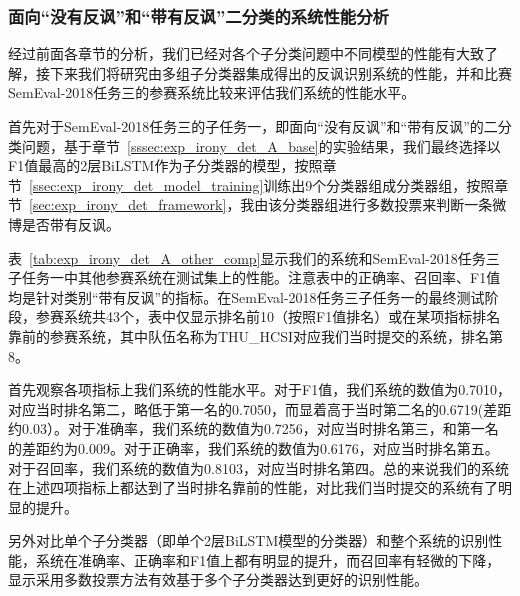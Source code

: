 \subsubsection{面向“没有反讽”和“带有反讽”二分类的系统性能分析}

经过前面各章节的分析，我们已经对各个子分类问题中不同模型的性能有大致了解，接下来我们将研究由多组子分类器集成得出的反讽识别系统的性能，并和比赛SemEval-2018任务三的参赛系统比较来评估我们系统的性能水平。

首先对于SemEval-2018任务三的子任务一，即面向“没有反讽”和“带有反讽”的二分类问题，基于章节~\ref{sssec:exp_irony_det_A_base}的实验结果，我们最终选择以F1值最高的2层BiLSTM作为子分类器的模型，按照章节~\ref{ssec:exp_irony_det_model_training}训练出9个分类器组成分类器组，按照章节~\ref{sec:exp_irony_det_framework}，我由该分类器组进行多数投票来判断一条微博是否带有反讽。

表~\ref{tab:exp_irony_det_A_other_comp}显示我们的系统和SemEval-2018任务三子任务一中其他参赛系统在测试集上的性能。注意表中的正确率、召回率、F1值均是针对类别“带有反讽”的指标。在SemEval-2018任务三子任务一的最终测试阶段，参赛系统共43个，表中仅显示排名前10（按照F1值排名）或在某项指标排名靠前的参赛系统，其中队伍名称为THU\_HCSI对应我们当时提交的系统，排名第8。

首先观察各项指标上我们系统的性能水平。对于F1值，我们系统的数值为0.7010，对应当时排名第二，略低于第一名的0.7050，而显着高于当时第二名的0.6719(差距约0.03）。对于准确率，我们系统的数值为0.7256，对应当时排名第三，和第一名的差距约为0.009。对于正确率，我们系统的数值为0.6176，对应当时排名第五。对于召回率，我们系统的数值为0.8103，对应当时排名第四。总的来说我们的系统在上述四项指标上都达到了当时排名靠前的性能，对比我们当时提交的系统有了明显的提升。

另外对比单个子分类器（即单个2层BiLSTM模型的分类器）和整个系统的识别性能，系统在准确率、正确率和F1值上都有明显的提升，而召回率有轻微的下降，显示采用多数投票方法有效基于多个子分类器达到更好的识别性能。


